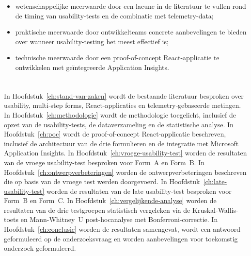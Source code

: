 \begin{itemize}
  \item wetenschappelijke meerwaarde door een lacune in de literatuur te vullen rond de timing van usability-tests en de combinatie met telemetry-data;
  \item praktische meerwaarde door ontwikkelteams concrete aanbevelingen te bieden over wanneer usability-testing het meest effectief is;
  \item technische meerwaarde door een proof-of-concept React-applicatie te ontwikkelen met geïntegreerde Application Insights.
\end{itemize}

\section{}%
\label{sec:opzet-bachelorproef}
In Hoofdstuk~\ref{ch:stand-van-zaken} wordt de bestaande literatuur besproken over usability, multi‑step forms, React‑applicaties en telemetry‑gebaseerde metingen.
In Hoofdstuk~\ref{ch:methodologie} wordt de methodologie toegelicht, inclusief de opzet van de usability‑tests, de dataverzameling en de statistische analyse.
In Hoofdstuk~\ref{ch:poc} wordt de proof-of-concept React-applicatie beschreven, inclusief de architectuur van de drie formulieren en de integratie met Microsoft Application Insights.
In Hoofdstuk~\ref{ch:vroege-usability-test} worden de resultaten van de vroege usability-test besproken voor Form~A en Form~B.
In Hoofdstuk~\ref{ch:ontwerpverbeteringen} worden de ontwerpverbeteringen beschreven die op basis van de vroege test werden doorgevoerd.
In Hoofdstuk~\ref{ch:late-usability-test} worden de resultaten van de late usability-test besproken voor Form~B en Form~C.
In Hoofdstuk~\ref{ch:vergelijkende-analyse} worden de resultaten van de drie testgroepen statistisch vergeleken via de Kruskal-Wallis-toets en Mann-Whitney~U post-hocanalyse met Bonferroni-correctie.
In Hoofdstuk~\ref{ch:conclusie} worden de resultaten samengevat, wordt een antwoord geformuleerd op de onderzoeksvraag en worden aanbevelingen voor toekomstig onderzoek geformuleerd.
